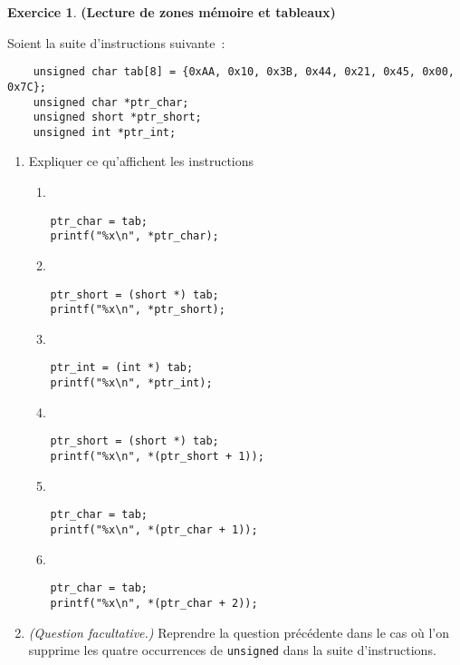 \documentclass[12pt]{article}
\theoremstyle{definition}
\newtheorem{Exercice}{Exercice}
\begin{document}
\begin{Exercice} {\bf (Lecture de zones mémoire et tableaux)}\smallskip

Soient la suite d'instructions suivante~:
\begin{lstlisting}
    unsigned char tab[8] = {0xAA, 0x10, 0x3B, 0x44, 0x21, 0x45, 0x00, 0x7C};
    unsigned char *ptr_char;
    unsigned short *ptr_short;
    unsigned int *ptr_int;
\end{lstlisting}
\begin{enumerate}
    \item Expliquer ce qu'affichent les instructions
    \begin{multicols}{2}
    \begin{enumerate}
        \item ~
\begin{lstlisting}
ptr_char = tab;
printf("%x\n", *ptr_char);
\end{lstlisting}
    \smallskip
    
    \item ~
\begin{lstlisting}
ptr_short = (short *) tab;
printf("%x\n", *ptr_short);
\end{lstlisting}
    \smallskip
    
    \item ~
\begin{lstlisting}
ptr_int = (int *) tab;
printf("%x\n", *ptr_int);
\end{lstlisting}
    \smallskip
    
    \item ~
\begin{lstlisting}
ptr_short = (short *) tab;
printf("%x\n", *(ptr_short + 1));
\end{lstlisting}
    \smallskip
    
    \item ~
\begin{lstlisting}
ptr_char = tab;
printf("%x\n", *(ptr_char + 1));
\end{lstlisting}
    \smallskip
    
    \item ~
\begin{lstlisting}
ptr_char = tab;
printf("%x\n", *(ptr_char + 2));
\end{lstlisting}
    \end{enumerate}
    \end{multicols}
    
    \item {\em (Question facultative.)} Reprendre la question 
    précédente dans le cas où l'on supprime les quatre occurrences 
    de {\tt unsigned} dans la suite d'instructions.
\end{enumerate}
\end{Exercice}
\bigskip
\end{document}
